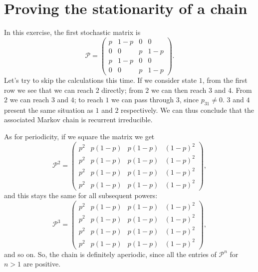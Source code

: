 \section{Proving the stationarity of a chain}
In this exercise, the first stochastic matrix is
\begin{equation}
  \mathcal{P} =
  \begin{pmatrix}
    p  & 1-p &  0  &  0  \\
    0  &  0  &  p  & 1-p \\
    p  & 1-p &  0  &  0  \\
    0  &  0  &  p  & 1-p
  \end{pmatrix}.
\end{equation}
Let’s try to skip the calculations this time. If we consider state $1$, from the
first row we see that we can reach $2$ directly; from $2$ we can then reach $3$
and $4$. From $2$ we can reach $3$ and $4$; to reach $1$ we can pass through
$3$, since $p_{31} \neq 0$. $3$ and $4$ present the same situation as $1$ and
$2$ respectively. We can thus conclude that the associated Markov chain is
recurrent irreducible.

As for periodicity, if we square the matrix we get
\begin{equation}
  \mathcal{P}^{2} =
  \begin{pmatrix}
    p^{2} & p(1-p) & p(1-p) & (1-p)^{2} \\
    p^{2} & p(1-p) & p(1-p) & (1-p)^{2} \\
    p^{2} & p(1-p) & p(1-p) & (1-p)^{2} \\
    p^{2} & p(1-p) & p(1-p) & (1-p)^{2}
  \end{pmatrix},
\end{equation}
and this stays the same for all subsequent powers:
\begin{equation}
  \mathcal{P}^{3} =
  \begin{pmatrix}
    p^{2} & p(1-p) & p(1-p) & (1-p)^{2} \\
    p^{2} & p(1-p) & p(1-p) & (1-p)^{2} \\
    p^{2} & p(1-p) & p(1-p) & (1-p)^{2} \\
    p^{2} & p(1-p) & p(1-p) & (1-p)^{2}
  \end{pmatrix},
\end{equation}
and so on. So, the chain is definitely aperiodic, since all the entries of
$\mathcal{P}^{n}$ for $n > 1$ are positive.

